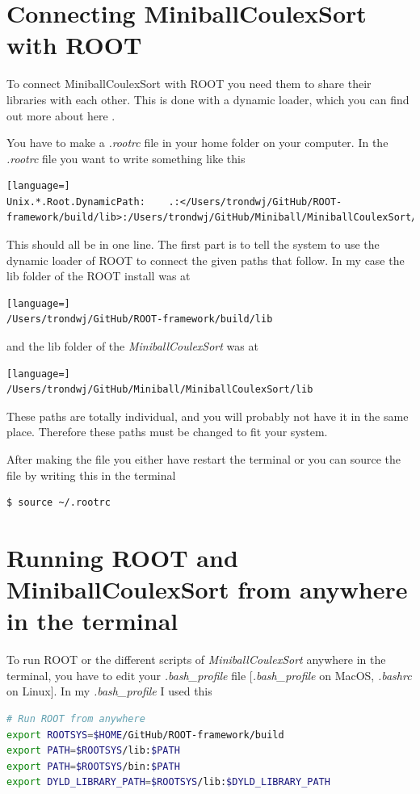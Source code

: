 \documentclass[twoside,english]{uiofysmaster/uiofysmaster}
\begin{document}
\begin{appendices}
\chapter{Connecting MiniballCoulexSort with ROOT}
To connect MiniballCoulexSort with ROOT you need them to share their libraries with each other. This is done with a dynamic loader, which you can find out more about here \cite{ROOTdynLoader}. 

You have to make a \textit{.rootrc} file in your home folder on your computer. In the \textit{.rootrc} file you want to write something like this 
\begin{lstlisting}[language=]
Unix.*.Root.DynamicPath:    .:</Users/trondwj/GitHub/ROOT-framework/build/lib>:/Users/trondwj/GitHub/Miniball/MiniballCoulexSort/lib:
\end{lstlisting}
This should all be in one line. The first part is to tell the system to use the dynamic loader of ROOT to connect the given paths that follow. In my case the lib folder of the ROOT install was at 
\begin{lstlisting}[language=]
/Users/trondwj/GitHub/ROOT-framework/build/lib
\end{lstlisting}
and the lib folder of the \textsl{MiniballCoulexSort} was at
\begin{lstlisting}[language=]
/Users/trondwj/GitHub/Miniball/MiniballCoulexSort/lib
\end{lstlisting}
These paths are totally individual, and you will probably not have it in the same place. Therefore these paths must be changed to fit your system. 

After making the file you either have restart the terminal or you can source the file by writing this in the terminal
\begin{lstlisting}[language=sh]
$ source ~/.rootrc
\end{lstlisting}


\chapter{Running ROOT and MiniballCoulexSort from anywhere in the terminal}
To run ROOT or the different scripts of \textsl{MiniballCoulexSort} anywhere in the terminal, you have to edit your \textit{.bash\_profile} file [\textit{.bash\_profile} on MacOS, \textit{.bashrc} on Linux]. In my \textit{.bash\_profile} I used this 
\begin{lstlisting}[language=sh]
# Run ROOT from anywhere
export ROOTSYS=$HOME/GitHub/ROOT-framework/build
export PATH=$ROOTSYS/lib:$PATH
export PATH=$ROOTSYS/bin:$PATH
export DYLD_LIBRARY_PATH=$ROOTSYS/lib:$DYLD_LIBRARY_PATH


\end{lstlisting}
\end{appendices}
\end{document}
